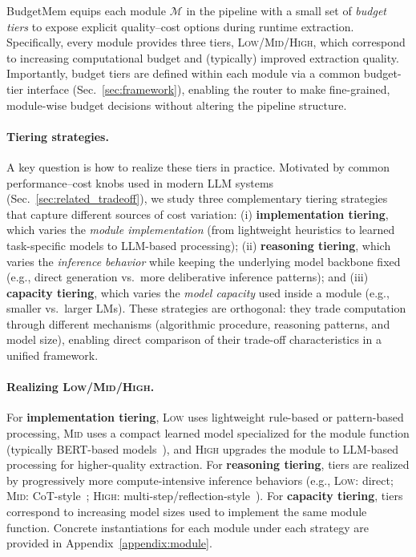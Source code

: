 BudgetMem equips each module $\mathcal{M}$ in the pipeline with a small set of \emph{budget tiers} to expose explicit quality--cost options during runtime extraction. Specifically, every module provides three tiers, \textsc{Low}/\textsc{Mid}/\textsc{High}, which correspond to increasing computational budget and (typically) improved extraction quality. Importantly, budget tiers are defined within each module via a common budget-tier interface (Sec.~\ref{sec:framework}), enabling the router to make fine-grained, module-wise budget decisions without altering the pipeline structure.

\paragraph{Tiering strategies.}
A key question is how to realize these tiers in practice. Motivated by common performance--cost knobs used in modern LLM systems (Sec.~\ref{sec:related_tradeoff}), we study three complementary tiering strategies that capture different sources of cost variation:
(i) \textbf{implementation tiering}, which varies the \emph{module implementation} (from lightweight heuristics to learned task-specific models to LLM-based processing);
(ii) \textbf{reasoning tiering}, which varies the \emph{inference behavior} while keeping the underlying model backbone fixed (e.g., direct generation vs.\ more deliberative inference patterns);
and (iii) \textbf{capacity tiering}, which varies the \emph{model capacity} used inside a module (e.g., smaller vs.\ larger LMs).
These strategies are orthogonal: they trade computation through different mechanisms (algorithmic procedure, reasoning patterns, and model size), enabling direct comparison of their trade-off characteristics in a unified framework.


\paragraph{Realizing \textsc{Low}/\textsc{Mid}/\textsc{High}.}
For \textbf{implementation tiering}, \textsc{Low} uses lightweight rule-based or pattern-based processing, \textsc{Mid} uses a compact learned model specialized for the module function (typically BERT-based models~\citep{devlin2019bert}), and \textsc{High} upgrades the module to LLM-based processing for higher-quality extraction.
For \textbf{reasoning tiering}, tiers are realized by progressively more compute-intensive inference behaviors (e.g., \textsc{Low}: direct; \textsc{Mid}: CoT-style~\citep{wei2022chain}; \textsc{High}: multi-step/reflection-style~\citep{shinn2023reflexion}).
For \textbf{capacity tiering}, tiers correspond to increasing model sizes used to implement the same module function.
Concrete instantiations for each module under each strategy are provided in Appendix~\ref{appendix:module}.








